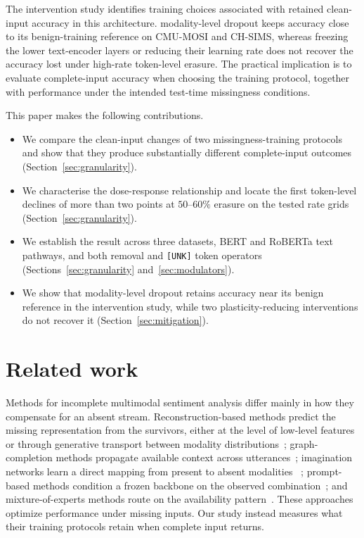 \documentclass[preprint,11pt]{elsarticle}
\newcommand{\tokenlevel}{token-level}
\newcommand{\modlevel}{modality-level}
\begin{document}
The intervention study identifies training choices associated with retained
clean-input accuracy in this architecture.
\modlevel{} dropout keeps accuracy close to its benign-training reference
on CMU-MOSI and CH-SIMS,
whereas freezing the lower text-encoder layers or reducing their learning rate
does not recover the accuracy lost under high-rate \tokenlevel{} erasure. The
practical implication is to evaluate complete-input accuracy when choosing
the training protocol, together with performance under the intended
test-time missingness conditions.

This paper makes the following contributions.
\begin{itemize}
  \item We compare the clean-input changes of two missingness-training
        protocols and show that they
        produce substantially different complete-input outcomes
        (Section~\ref{sec:granularity}).
  \item We characterise the dose-response relationship and locate the first
        token-level declines of more than two points at $50$--$60\%$ erasure
        on the tested rate grids
        (Section~\ref{sec:granularity}).
  \item We establish the result across three datasets, BERT and RoBERTa text
        pathways, and both removal and \texttt{[UNK]} token operators
        (Sections~\ref{sec:granularity} and~\ref{sec:modulators}).
  \item We show that \modlevel{} dropout retains accuracy near its benign
        reference in the intervention study,
        while two plasticity-reducing interventions do not recover it
        (Section~\ref{sec:mitigation}).
\end{itemize}

\section{Related work}\label{sec:related}

Methods for incomplete multimodal sentiment analysis differ mainly in how they
compensate for an absent stream. Reconstruction-based methods
predict the missing representation from the survivors, either at the level of
low-level features~\cite{tfrnet,emtdlfr} or through generative transport
between modality distributions~\cite{dicmor}; graph-completion methods
propagate available context across utterances~\cite{gcnet}; imagination
networks learn a direct mapping from present to absent modalities
~\cite{mmin}; prompt-based methods condition a frozen backbone on the observed
combination~\cite{mplmm}; and mixture-of-experts methods route on the
availability pattern~\cite{flexmoe,derl}. These approaches optimize
performance under missing inputs. Our study instead measures what their
training protocols retain when complete input returns.
\end{document}
